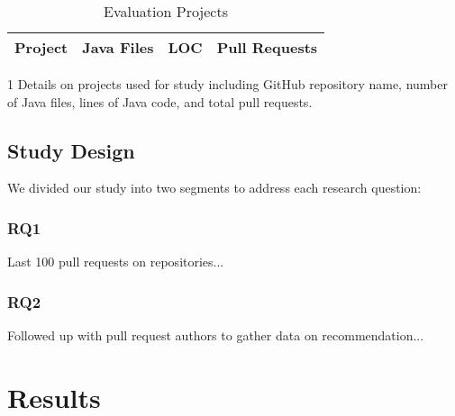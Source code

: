\documentclass[conference]{IEEEtran}
\begin{document}
\begin{table}
	\centering
	\caption{Evaluation Projects}
	\begin{tabular}{|l|l|l|c|}
		\hline
		\textbf{Project} & \textbf{Java Files} & \textbf{LOC} & \textbf{Pull Requests} \\
		\hline
		\end{tabular}
	\begin{tablenotes}
        \item[1] Details on projects used for study including GitHub repository name, number of Java files, lines of Java code, and total pull requests.
    \end{tablenotes}
	\label{tools}
\end{table}


\subsection{Study Design}

We divided our study into two segments to address each research question:

\subsubsection{RQ1}

Last 100 pull requests on repositories...

\subsubsection{RQ2}

Followed up with pull request authors to gather data on recommendation...

\section{Results}
\end{document}
